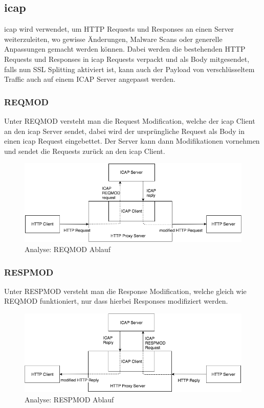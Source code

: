 \subsection{\gls{icap}}
\label{analyse:icap}
\gls{icap}\cite{wiki:icap} wird verwendet, um HTTP Requests und Responses an einen Server weiterzuleiten, wo gewisse Änderungen, Malware Scans oder generelle Anpassungen gemacht werden können.
Dabei werden die bestehenden HTTP Requests und Responses in \gls{icap} Requests verpackt und als Body mitgesendet, falls nun SSL Splitting aktiviert ist, kann auch der Payload von verschlüsseltem Traffic auch auf einem ICAP Server angepasst werden.
\subsubsection{REQMOD}
Unter REQMOD versteht man die Request Modification, welche der \gls{icap} Client an den \gls{icap} Server sendet, dabei wird der ursprüngliche Request als Body in einen \gls{icap} Request eingebettet.
Der Server kann dann Modifikationen vornehmen und sendet die Requests zurück an den \gls{icap} Client.
\begin{figure}[H]
	\includegraphics[width=\textwidth]{img/reqmod.png}
	\caption{Analyse: REQMOD Ablauf}
\end{figure}
\subsubsection{RESPMOD}
Unter RESPMOD versteht man die Response Modification, welche gleich wie REQMOD funktioniert, nur dass hierbei Responses modifiziert werden.
\begin{figure}[H]
	\includegraphics[width=\textwidth]{img/respmod.png}
	\caption{Analyse: RESPMOD Ablauf}
\end{figure}


